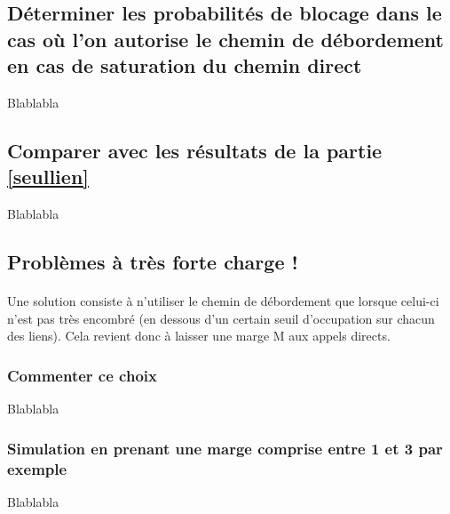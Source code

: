         \subsection{Déterminer les probabilités de blocage dans le cas où l'on autorise le chemin de débordement en cas de saturation du chemin direct}
Blablabla
%
        \subsection{Comparer avec les résultats de la partie \ref{seullien}}
Blablabla
%
        \subsection{Problèmes à très forte charge !}
            \paragraph{}
Une solution consiste à n'utiliser le chemin de débordement que lorsque celui-ci n'est pas très encombré (en dessous d'un certain seuil d'occupation sur chacun des liens).
Cela revient donc à laisser une marge M aux appels directs.
%
            \subsubsection{Commenter ce choix}
Blablabla
%
            \subsubsection{Simulation en prenant une marge comprise entre 1 et 3 par exemple}
Blablabla
%
    \clearpage
%
